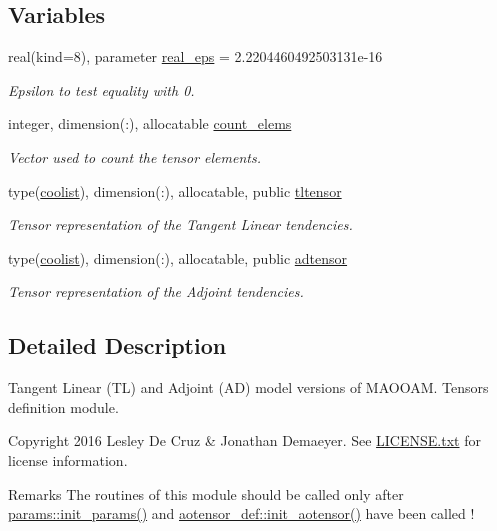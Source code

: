 \subsection*{Variables}
\begin{DoxyCompactItemize}
\item 
real(kind=8), parameter \hyperlink{namespacetl__ad__tensor_a05a4b79ccb098a47a400e175e12c1c6c}{real\+\_\+eps} = 2.\+2204460492503131e-\/16
\begin{DoxyCompactList}\small\item\em Epsilon to test equality with 0. \end{DoxyCompactList}\item 
integer, dimension(\+:), allocatable \hyperlink{namespacetl__ad__tensor_a8836f34c3a96c44c487c7910ab8c7507}{count\+\_\+elems}
\begin{DoxyCompactList}\small\item\em Vector used to count the tensor elements. \end{DoxyCompactList}\item 
type(\hyperlink{structtensor_1_1coolist}{coolist}), dimension(\+:), allocatable, public \hyperlink{namespacetl__ad__tensor_a6180cfcc4d4ad119ef93266ea955903c}{tltensor}
\begin{DoxyCompactList}\small\item\em Tensor representation of the Tangent Linear tendencies. \end{DoxyCompactList}\item 
type(\hyperlink{structtensor_1_1coolist}{coolist}), dimension(\+:), allocatable, public \hyperlink{namespacetl__ad__tensor_af0a4e6cdc6d653fa808eedaa7ce331de}{adtensor}
\begin{DoxyCompactList}\small\item\em Tensor representation of the Adjoint tendencies. \end{DoxyCompactList}\end{DoxyCompactItemize}


\subsection{Detailed Description}
Tangent Linear (TL) and Adjoint (AD) model versions of M\+A\+O\+O\+AM. Tensors definition module. 

\begin{DoxyCopyright}{Copyright}
2016 Lesley De Cruz \& Jonathan Demaeyer. See \hyperlink{LICENSE_8txt}{L\+I\+C\+E\+N\+S\+E.\+txt} for license information. 
\end{DoxyCopyright}
\begin{DoxyRemark}{Remarks}
The routines of this module should be called only after \hyperlink{namespaceparams_aa5d1f7f88b00cf3705691de2f6f92a08}{params\+::init\+\_\+params()} and \hyperlink{namespaceaotensor__def_ac2d5a88885d06f6dc047bee3a4ab427a}{aotensor\+\_\+def\+::init\+\_\+aotensor()} have been called ! 
\end{DoxyRemark}


